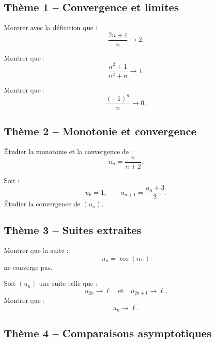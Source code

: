 \documentclass[11pt,a4paper]{article}
\begin{document}
\subsection*{Thème 1 -- Convergence et limites}

\begin{exercicebox}[1]
Montrer avec la définition que :
\[
\frac{2n+1}{n}\to2.
\]
\end{exercicebox}

\begin{exercicebox}[2]
Montrer que :
\[
\frac{n^2+1}{n^2+n}\to1.
\]
\end{exercicebox}

\begin{exercicebox}[3]
Montrer que :
\[
\frac{(-1)^n}{n}\to0.
\]
\end{exercicebox}

\subsection*{Thème 2 -- Monotonie et convergence}

\begin{exercicebox}[4]
Étudier la monotonie et la convergence de :
\[
u_n=\frac{n}{n+2}.
\]
\end{exercicebox}

\begin{exercicebox}[5]
Soit :
\[
u_0=1,
\qquad
u_{n+1}=\frac{u_n+3}{2}.
\]
Étudier la convergence de \((u_n)\).
\end{exercicebox}

\subsection*{Thème 3 -- Suites extraites}

\begin{exercicebox}[6]
Montrer que la suite :
\[
u_n=\cos(n\pi)
\]
ne converge pas.
\end{exercicebox}

\begin{exercicebox}[7]
Soit \((u_n)\) une suite telle que :
\[
u_{2n}\to\ell
\quad\text{et}\quad
u_{2n+1}\to\ell.
\]
Montrer que :
\[
u_n\to\ell.
\]
\end{exercicebox}

\subsection*{Thème 4 -- Comparaisons asymptotiques}
\end{document}
